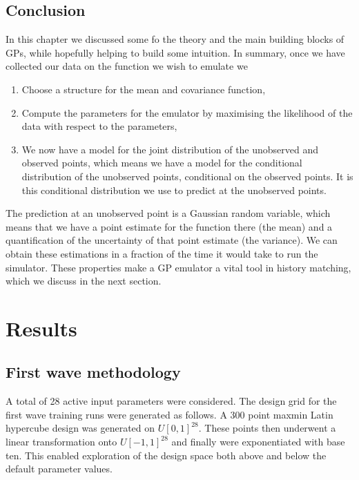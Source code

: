 \documentclass[
  12pt,
  a4paper,
  twoside]{book}
\providecommand{\tightlist}{%
  \setlength{\itemsep}{0pt}\setlength{\parskip}{0pt}}
\begin{document}
\hypertarget{conclusion-3}{%
\section{Conclusion}\label{conclusion-3}}

In this chapter we discussed some fo the theory and the main building blocks of GPs, while hopefully helping to build some intuition. In summary, once we have collected our data on the function we wish to emulate we

\begin{enumerate}
\def\labelenumi{\arabic{enumi}.}
\tightlist
\item
  Choose a structure for the mean and covariance function,
\item
  Compute the parameters for the emulator by maximising the likelihood of the data with respect to the parameters,
\item
  We now have a model for the joint distribution of the unobserved and observed points, which means we have a model for the conditional distribution of the unobserved points, conditional on the observed points. It is this conditional distribution we use to predict at the unobserved points.
\end{enumerate}

The prediction at an unobserved point is a Gaussian random variable, which means that we have a point estimate for the function there (the mean) and a quantification of the uncertainty of that point estimate (the variance). We can obtain these estimations in a fraction of the time it would take to run the simulator. These properties make a GP emulator a vital tool in history matching, which we discuss in the next section.

\hypertarget{results}{%
\chapter{Results}\label{results}}

\hypertarget{wave1-methodology}{%
\section{First wave methodology}\label{wave1-methodology}}

A total of 28 active input parameters were considered. The design grid for the first wave training runs were generated as follows. A 300 point maxmin Latin hypercube design was generated on \(U[0,1]^{28}\). These points then underwent a linear transformation onto \(U[-1,1]^{28}\) and finally were exponentiated with base ten. This enabled exploration of the design space both above and below the default parameter values.
\end{document}
